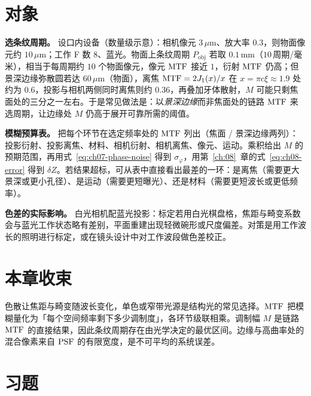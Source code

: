\section{对象}
\label{sec:ch08-object}

\textbf{选条纹周期。} 设口内设备（数量级示意）：相机像元 $3\,\mu\mathrm{m}$、放大率 $0.3$，则物面像元约 $10\,\mu\mathrm{m}$；工作 F 数 $8$、蓝光。物面上条纹周期 $P_{\mathrm{obj}}$ 若取 $0.1\,\mathrm{mm}$（$10\,$周期/毫米），相当于每周期约 $10$ 个物面像元，像元 $\mathrm{MTF}$ 接近 $1$，衍射 $\mathrm{MTF}$ 仍高；但景深边缘弥散圆若达 $60\,\mu\mathrm{m}$（物面），离焦 $\mathrm{MTF}=2J_1(x)/x$ 在 $x=\pi c\xi\approx1.9$ 处约为 $0.6$，投影与相机两侧同时离焦则约 $0.36$，再叠加牙体散射，$M$ 可能只剩焦面处的三分之一左右。于是常见做法是：以\emph{景深边缘}而非焦面处的链路 $\mathrm{MTF}$ 来选周期，让边缘处 $M$ 仍高于展开可靠所需的阈值。

\textbf{模糊预算表。} 把每个环节在选定频率处的 $\mathrm{MTF}$ 列出（焦面 / 景深边缘两列）：投影衍射、投影离焦、材料、相机衍射、相机离焦、像元、运动。乘积给出 $M$ 的预期范围，再用式~\eqref{eq:ch07-phase-noise} 得到 $\sigma_\varphi$，用第~\ref{ch:08}~章的式~\eqref{eq:ch08-error} 得到 $\delta Z$。若结果超标，可从表中直接看出最差的一环：是离焦（需要更大景深或更小孔径）、是运动（需要更短曝光）、还是材料（需要更短波长或更低频率）。

\textbf{色差的实际影响。} 白光相机配蓝光投影：标定若用白光棋盘格，焦距与畸变系数会与蓝光工作状态略有差别，平面重建出现轻微碗形或尺度偏差。对策是用工作波长的照明进行标定，或在镜头设计中对工作波段做色差校正。

\section*{本章收束}
色散让焦距与畸变随波长变化，单色或窄带光源是结构光的常见选择。$\mathrm{MTF}$ 把模糊量化为「每个空间频率剩下多少调制度」，各环节级联相乘。调制幅 $M$ 是链路 $\mathrm{MTF}$ 的直接结果，因此条纹周期存在由光学决定的最优区间。边缘与高曲率处的混合像素来自 $\mathrm{PSF}$ 的有限宽度，是不可平均的系统误差。

\section{习题}
\label{sec:ch08-exercises}

